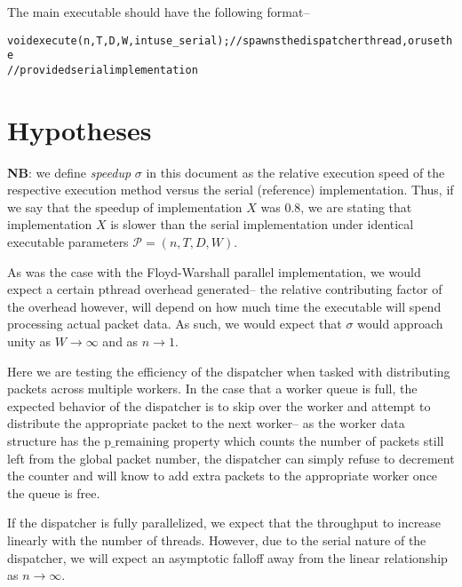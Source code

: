 \documentclass{article}
\newcommand{\ti}[1]{\emph{#1}}
\newcommand{\tb}[1]{\textbf{#1}}
\newcommand{\cpart}[1]{\newblock{\LARGE {\\\\#1}}}
\newcommand{\code}[1]{\texttt{$\text{#1}$}}
\begin{document}
\cpart{Executable}

The main executable should have the following format--

\begin{alltt}
void execute(n, T, D, W, int use_serial);    // spawns the dispatcher thread, or use the
                                             //   provided serial implementation
\end{alltt}

\section{Hypotheses}

\tb{NB}: we define \ti{speedup} $\sigma$ in this document as the relative execution speed of the respective execution method versus the serial (reference) 
implementation. Thus, if we say that the speedup of implementation $X$ was $0.8$, we are stating that implementation $X$ is slower than the serial implementation 
under identical executable parameters $\mathcal{P} = (n, T, D, W)$.

\cpart{Parallel Overhead}

As was the case with the Floyd-Warshall parallel implementation, we would expect a certain \code{pthread} overhead generated-- the relative contributing factor of 
the overhead however, will depend on how much time the executable will spend processing actual packet data. As such, we would expect that $\sigma$ would approach 
unity as $W \to \infty$ and as $n \to 1$.

\cpart{Dispatcher Rate}

Here we are testing the efficiency of the dispatcher when tasked with distributing packets across multiple workers. In the case that a worker queue is full, the 
expected behavior of the dispatcher is to skip over the worker and attempt to distribute the appropriate packet to the next worker-- as the \code{worker} data 
structure has the \code{p\_remaining} property which counts the number of packets still left from the global packet number, the dispatcher can simply refuse to 
decrement the counter and will know to add extra packets to the appropriate worker once the queue is free.

If the dispatcher is fully parallelized, we expect that the throughput to increase linearly with the number of threads. However, due to the serial nature of the 
dispatcher, we will expect an asymptotic falloff away from the linear relationship as $n \to \infty$.
\end{document}

